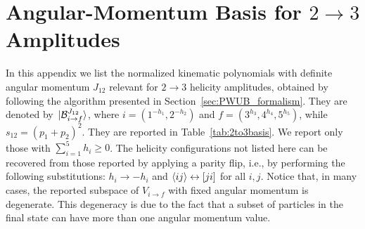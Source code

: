 \section{\texorpdfstring{Angular-Momentum Basis for $2 \to 3$ Amplitudes}{Angular-Momentum Basis for 2-to-3 Amplitudes}\label{app:2-to-3_basis}}

In this appendix we list the normalized kinematic polynomials with definite angular momentum $J_{12}$ relevant for $2 \to 3$ helicity amplitudes, obtained by following the algorithm presented in Section~\ref{sec:PWUB_formalism}.
They are denoted by $\ket*{\mathcal B^{J_{12}}_{i\to f}}$, where $i=(1^{-h_1},2^{-h_2})$ and $f=(3^{h_3},4^{h_4},5^{h_5})$, while $s_{12} = (p_1+p_2)^2$.
They are reported in Table~\ref{tab:2to3basis}.
We report only those with $\sum_{i=1}^5 h_i \ge 0$. The helicity configurations not listed here can be recovered from those reported
by applying a parity flip, i.e., by performing the following substitutions: $h_i \to -h_i$ and $\langle i j \rangle\leftrightarrow \lbrack j i \rbrack$ for all $i,j$.
Notice that, in many cases, the reported subspace of $V_{i\to f}$ with fixed angular momentum is degenerate.
This degeneracy is due to the fact that a subset of particles in the final state can have more than one angular momentum value.

